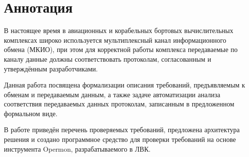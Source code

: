 \section*{Аннотация}

В настоящее время в авиационных и корабельных бортовых вычислительных 
комплексах широко используется мультиплексный канал информационного обмена 
(МКИО), при этом для корректной работы комплекса передаваемые по каналу данные 
должны соответствовать протоколам, согласованным и утверждённым разработчиками.

Данная работа посвящена формализации описания требований, предъявляемым 
к обменам и передаваемым данным, а также задаче автоматизации анализа 
соответствия передаваемых данных протоколам, записанным в предложенном 
формальном виде.

В работе приведён перечень проверяемых требований, предложена архитектура 
решения и создано программное средство для проверки требований на основе 
инструмента Opermon, разрабатываемого в ЛВК.